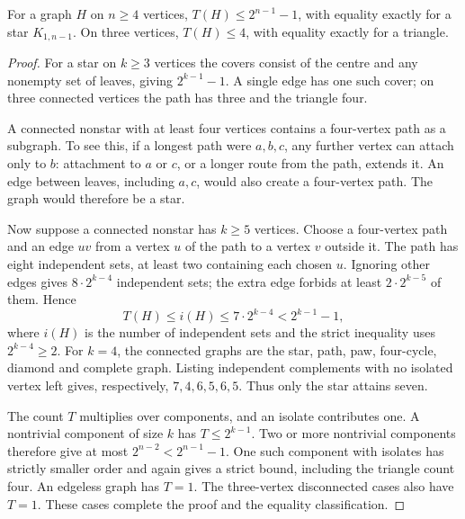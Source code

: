 \begin{lemma}\label{lem:cover-bound}
For a graph $H$ on $n\ge4$ vertices, $T(H)\le2^{n-1}-1$, with equality
exactly for a star $K_{1,n-1}$. On three vertices, $T(H)\le4$, with equality
exactly for a triangle.
\end{lemma}
\begin{proof}
For a star on $k\ge3$ vertices the covers consist of the centre and any
nonempty set of leaves, giving $2^{k-1}-1$. A single edge has one such cover;
on three connected vertices the path has three and the triangle four.

A connected nonstar with at least four vertices contains a four-vertex
path as a subgraph. To see this, if a longest path were $a,b,c$, any further
vertex can attach only to $b$: attachment to $a$ or $c$, or a longer route
from the path, extends it. An edge between leaves, including $a,c$, would
also create a four-vertex path. The graph would therefore be a star.

Now suppose a connected nonstar has $k\ge5$ vertices. Choose a four-vertex
path and an edge $uv$ from a vertex $u$ of the path to a vertex $v$ outside
it. The path has eight independent sets, at least two containing each
chosen $u$. Ignoring other edges gives $8\cdot2^{k-4}$ independent sets;
the extra edge forbids at least $2\cdot2^{k-5}$ of them. Hence
\[
 T(H)\le i(H)\le7\cdot2^{k-4}<2^{k-1}-1,
\]
where $i(H)$ is the number of independent sets and the strict inequality
uses $2^{k-4}\ge2$. For $k=4$, the connected graphs are the star, path,
paw, four-cycle, diamond and complete graph. Listing independent
complements with no isolated vertex left gives, respectively,
$7,4,6,5,6,5$. Thus only the star attains seven.

The count $T$ multiplies over components, and an isolate contributes one.
A nontrivial component of size $k$ has $T\le2^{k-1}$. Two or more
nontrivial components therefore give at most $2^{n-2}<2^{n-1}-1$.
One such component with isolates has strictly smaller order and again
gives a strict bound, including the triangle count four. An edgeless graph
has $T=1$. The three-vertex disconnected cases also have $T=1$.
These cases complete the proof and the equality classification.
\end{proof}

